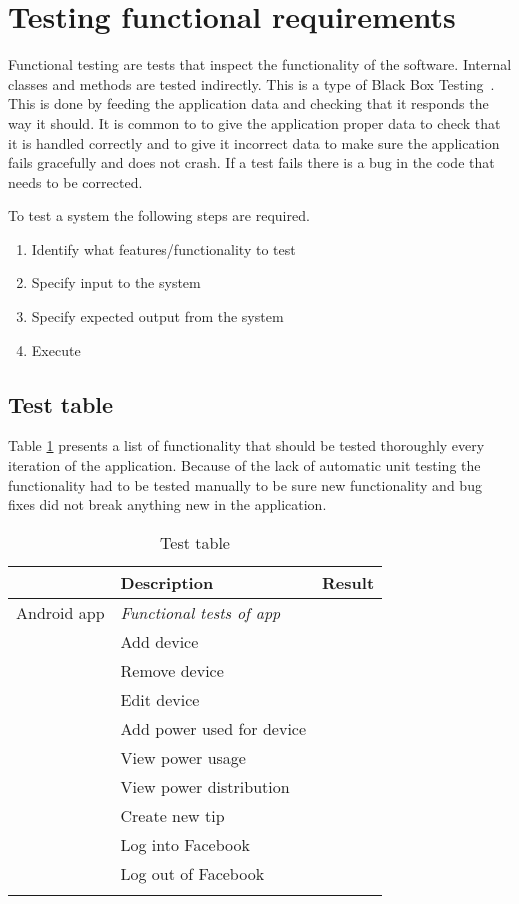 \section{Testing functional requirements}
\label{sec:funcTest}
Functional testing are tests that inspect the functionality of the software. Internal classes and methods are tested indirectly. This is a type of Black Box Testing~\cite{blackbox}. This is done by feeding the application data and checking that it responds the way it should. It is common to to give the application proper data to check that it is handled correctly and to give it incorrect data to make sure the application fails gracefully and does not crash. If a test fails there is a bug in the code that needs to be corrected.

To test a system the following steps are required.
\begin{enumerate}
\item Identify what features/functionality to test
\item Specify input to the system
\item Specify expected output from the system
\item Execute
\end{enumerate}

\subsection{Test table}
Table \ref{tab:testTable} presents a list of functionality that should be tested thoroughly every iteration of the application. Because of the lack of automatic unit testing the functionality had to be tested manually to be sure new functionality and bug fixes did not break anything new in the application.

\begin{table}[H]
\begin{tabular}{|l|l|l|}
\hline
\rowcolor{darkgray} & \textbf{Description} & \textbf{Result}\\\hline \arrayrulecolor{lightgray}
\rowcolors{0}{darkgray}{lightgray}
Android app & \textit{Functional tests of app} &  \\ \cline{1-2}\cline{2-3}
&Add device&\\ \cline{1-2}\cline{2-3}
&Remove device&\\ \cline{1-2}\cline{2-3}
&Edit device&\\ \cline{1-2}\cline{2-3}
&Add power used for device&\\ \cline{1-2}\cline{2-3}
&View power usage&\\ \cline{1-2}\cline{2-3}
&View power distribution&\\ \cline{1-2}\cline{2-3}
&Create new tip&\\ \cline{1-2}\cline{2-3}
&Log into Facebook&\\ \cline{1-2}\cline{2-3}
&Log out of Facebook&\\\arrayrulecolor{black}
\hline
\end{tabular}
\caption{Test table}
\label{tab:testTable}
\end{table}
